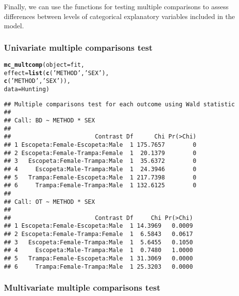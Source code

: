 \documentclass[article]{jss}\usepackage[]{graphicx}\usepackage[]{xcolor}
\makeatletter
\newcommand{\hlstr}[1]{\textcolor[rgb]{0.192,0.494,0.8}{#1}}%
\newcommand{\hlstd}[1]{\textcolor[rgb]{0.345,0.345,0.345}{#1}}%
\newcommand{\hlkwc}[1]{\textcolor[rgb]{0.333,0.667,0.333}{#1}}%
\newcommand{\hlkwd}[1]{\textcolor[rgb]{0.737,0.353,0.396}{\textbf{#1}}}%
\newenvironment{kframe}{%
 \def\at@end@of@kframe{}%
 \ifinner\ifhmode%
  \def\at@end@of@kframe{\end{minipage}}%
  \begin{minipage}{\columnwidth}%
 \fi\fi%
 \def\FrameCommand##1{\hskip\@totalleftmargin \hskip-\fboxsep
 \colorbox{shadecolor}{##1}\hskip-\fboxsep
     \hskip-\linewidth \hskip-\@totalleftmargin \hskip\columnwidth}%
 \MakeFramed {\advance\hsize-\width
   \@totalleftmargin\z@ \linewidth\hsize
   \@setminipage}}%
 {\par\unskip\endMakeFramed%
 \at@end@of@kframe}
\newenvironment{knitrout}{}{} %
\makeatother
\begin{document}
Finally, we can use the functions for testing multiple comparisons to assess differences between levels of categorical explanatory variables included in the model. 

\subsubsection{Univariate multiple comparisons test}

\begin{knitrout}
\color{fgcolor}\begin{kframe}
\begin{alltt}
\hlkwd{mc_multcomp}\hlstd{(}\hlkwc{object} \hlstd{= fit,}
            \hlkwc{effect} \hlstd{=} \hlkwd{list}\hlstd{(}\hlkwd{c}\hlstd{(}\hlstr{'METHOD'}\hlstd{,} \hlstr{'SEX'}\hlstd{),}
                          \hlkwd{c}\hlstd{(}\hlstr{'METHOD'}\hlstd{,} \hlstr{'SEX'}\hlstd{)),}
            \hlkwc{data} \hlstd{= Hunting)}
\end{alltt}
\begin{verbatim}
## Multiple comparisons test for each outcome using Wald statistic
## 
## Call: BD ~ METHOD * SEX
## 
##                        Contrast Df      Chi Pr(>Chi)
## 1 Escopeta:Female-Escopeta:Male  1 175.7657        0
## 2 Escopeta:Female-Trampa:Female  1  20.1379        0
## 3   Escopeta:Female-Trampa:Male  1  35.6372        0
## 4     Escopeta:Male-Trampa:Male  1  24.3946        0
## 5   Trampa:Female-Escopeta:Male  1 217.7398        0
## 6     Trampa:Female-Trampa:Male  1 132.6125        0
## 
## Call: OT ~ METHOD * SEX
## 
##                        Contrast Df     Chi Pr(>Chi)
## 1 Escopeta:Female-Escopeta:Male  1 14.3969   0.0009
## 2 Escopeta:Female-Trampa:Female  1  6.5843   0.0617
## 3   Escopeta:Female-Trampa:Male  1  5.6455   0.1050
## 4     Escopeta:Male-Trampa:Male  1  0.7480   1.0000
## 5   Trampa:Female-Escopeta:Male  1 31.3069   0.0000
## 6     Trampa:Female-Trampa:Male  1 25.3203   0.0000
\end{verbatim}
\end{kframe}
\end{knitrout}

\subsubsection{Multivariate multiple comparisons test}
\end{document}
